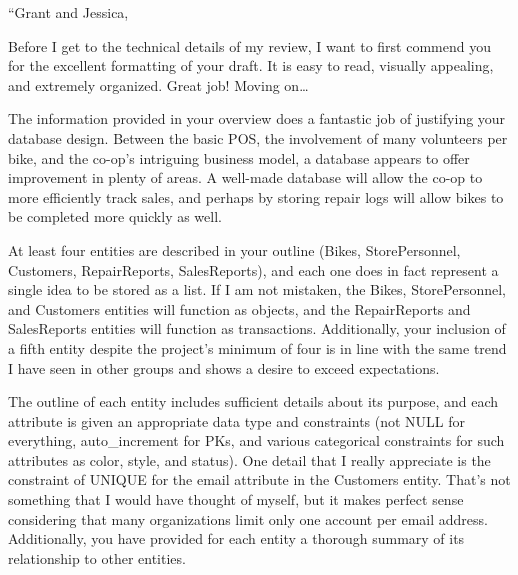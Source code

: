 \documentclass{article}
\begin{document}
\begin{tcolorbox}[colback=secondarycolor, colframe=primarycolor, title=\textbf{Peer Review 3 - Drew Schlabach}]
``Grant and Jessica,

\vspace{0.2cm}

Before I get to the technical details of my review, I want to first commend you for the excellent formatting of your draft. It is easy to read, visually appealing, and extremely organized. Great job! Moving on…

\vspace{0.2cm}

The information provided in your overview does a fantastic job of justifying your database design. Between the basic POS, the involvement of many volunteers per bike, and the co-op’s intriguing business model, a database appears to offer improvement in plenty of areas. A well-made database will allow the co-op to more efficiently track sales, and perhaps by storing repair logs will allow bikes to be completed more quickly as well. 

\vspace{0.2cm}

At least four entities are described in your outline (Bikes, StorePersonnel, Customers, RepairReports, SalesReports), and each one does in fact represent a single idea to be stored as a list. If I am not mistaken, the Bikes, StorePersonnel, and Customers entities will function as objects, and the RepairReports and SalesReports entities will function as transactions. Additionally, your inclusion of a fifth entity despite the project’s minimum of four is in line with the same trend I have seen in other groups and shows a desire to exceed expectations.

\vspace{0.2cm}

The outline of each entity includes sufficient details about its purpose, and each attribute is given an appropriate data type and constraints (not NULL for everything, auto\_increment for PKs, and various categorical constraints for such attributes as color, style, and status). One detail that I really appreciate is the constraint of UNIQUE for the email attribute in the Customers entity. That’s not something that I would have thought of myself, but it makes perfect sense considering that many organizations limit only one account per email address. Additionally, you have provided for each entity a thorough summary of its relationship to other entities. 


\end{tcolorbox}
\end{document}
